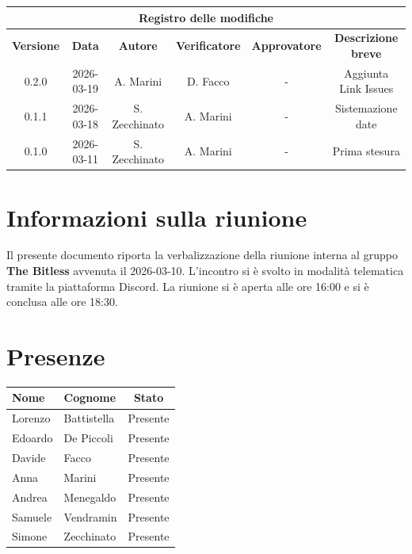 \documentclass[a4paper, 10pt, colorlinks=true, linkcolor=black, urlcolor=blue, citecolor=blue, hidelinks]{article}
\begin{document}
\newcommand{\tipoverbale}{interno}
\newcommand{\dataverbale}{2026-03-10}
\newcommand{\dataversione}{2026-03-18}
\newcommand{\versione}{0.1.1}
\newcommand{\stato}{Stesura}
\newcommand{\destinatari}{The Bitless, prof. Tullio Vardanega, prof. Riccardo Cardin}

\begin{titlepage}

\end{titlepage}

\newpage
{}

\begin{center}
    \begin{tabular}{|c|c|c|c|c|c|}
        \hline
        \multicolumn{6}{|c|}{\textbf{Registro delle modifiche}} \\
        \hline
        \textbf{Versione} & \textbf{Data} & \textbf{Autore} & \textbf{Verificatore} & \textbf{Approvatore} & \textbf{Descrizione breve} \\
        \hline
        0.2.0 & 2026-03-19 & A. Marini & D. Facco & - &  Aggiunta Link Issues \\
        \hline
        0.1.1 & \dataversione & S. Zecchinato & A. Marini & - & Sistemazione date \\
        \hline 
        0.1.0 & 2026-03-11 & S. Zecchinato & A. Marini & - & Prima stesura \\
        \hline
    \end{tabular}
\end{center}

\newpage
\tableofcontents 

\newpage
\section{Informazioni sulla riunione}
Il presente documento riporta la verbalizzazione della riunione interna al gruppo \textbf{The Bitless} avvenuta il \dataverbale{}. L'incontro si è svolto in modalità telematica tramite la piattaforma Discord. La riunione si è aperta alle ore 16:00 e si è conclusa alle ore 18:30.

\section{Presenze}
\begin{center}
\begin{tabular}{|l|l|c|}
\hline
\textbf{Nome} & \textbf{Cognome} & \textbf{Stato} \\
\hline
Lorenzo & Battistella & Presente \\
Edoardo & De Piccoli & Presente \\
Davide & Facco & Presente \\
Anna & Marini & Presente \\
Andrea & Menegaldo & Presente \\
Samuele & Vendramin & Presente \\
Simone & Zecchinato & Presente \\
\hline
\end{tabular}
\end{center}
\end{document}
